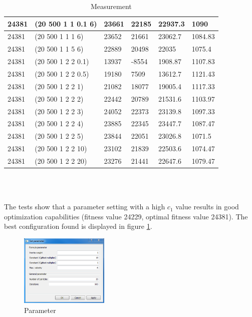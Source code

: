 \documentclass{article}
\begin{document}
\begin{table}
\begin{tabular}{|l|l|l|l|l|l|}
	24381 & (20 500 1 1 0.1 6) & 23661 & 22185 & 22937.3 & 1090 \\ \hline
	24381 & (20 500 1 1 1 6) & 23652 & 21661 & 23062.7 & 1084.83 \\ \hline
	24381 & (20 500 1 1 5 6) & 22889 & 20498 & 22035 & 1075.4 \\ \hline
	24381 & (20 500 1 2 2 0.1) & 13937 & -8554 & 1908.87 & 1107.83 \\ \hline
	24381 & (20 500 1 2 2 0.5) & 19180 & 7509 & 13612.7 & 1121.43 \\ \hline
	24381 & (20 500 1 2 2 1) & 21082 & 18077 & 19005.4 & 1117.33 \\ \hline
	24381 & (20 500 1 2 2 2) & 22442 & 20789 & 21531.6 & 1103.97 \\ \hline
	24381 & (20 500 1 2 2 3) & 24052 & 22373 & 23139.8 & 1097.33 \\ \hline
	24381 & (20 500 1 2 2 4) & 23885 & 22345 & 23447.7 & 1087.47 \\ \hline
	24381 & (20 500 1 2 2 5) & 23844 & 22051 & 23026.8 & 1071.5 \\ \hline
	24381 & (20 500 1 2 2 10) & 23102 & 21839 & 22503.6 & 1074.47 \\ \hline
	24381 & (20 500 1 2 2 20) & 23276 & 21441 & 22647.6 & 1079.47 \\ \hline
\end{tabular} \\\\
\caption{Measurement}
\end{table}

\newpage

The tests show that a parameter setting with a high $c_1$ value results in good optimization capabilities (fitness value 24229, optimal fitness value 24381). The best configuration found is displayed in figure \ref{fig-param}.

\begin{figure}[H]
    \centering
    \includegraphics[width=160px]{images/parameter.PNG}
    \caption{Parameter}
    \label{fig-param}
\end{figure}
\end{document}
